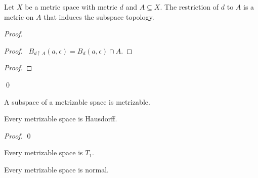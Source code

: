 \begin{proposition}
    Let $X$ be a metric space with metric $d$ and $A \subseteq X$. The restriction of $d$ to $A$ is a metric on $A$ that induces the subspace topology.
\end{proposition}

\begin{proof}
    \pf
    \begin{proof}
        \pf\ $B_{d \restriction A}(a, \epsilon) = B_d(a, \epsilon) \cap A$.
    \end{proof}
    \begin{proof}
    \end{proof}
    \qed
\end{proof}

\begin{corollary}
    A subspace of a metrizable space is metrizable.
\end{corollary}

\begin{proposition}
    \label{proposition:metrizable_Hausdorff}
    Every metrizable space is Hausdorff.
\end{proposition}

\begin{proof}
    \pf
    \qed
\end{proof}

\begin{corollary}
    \label{corollary:metrizable_T1}
    Every metrizable space is $T_1$.
\end{corollary}

\begin{proposition}
    \label{proposition:metrizable_normal}
    Every metrizable space is normal.
\end{proposition}

